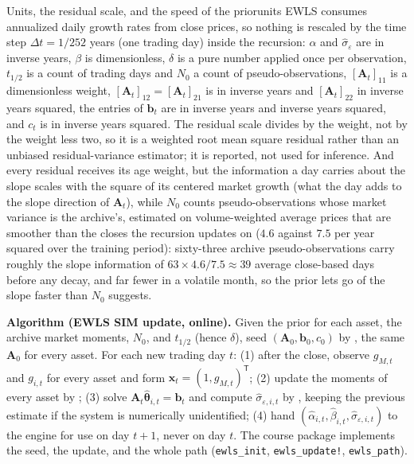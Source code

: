 \documentclass[11pt]{article}
\newcommand{\bx}{\mathbf x}
\newcommand{\bA}{\mathbf A}
\newcommand{\bb}{\mathbf b}
\newcommand{\bth}{\boldsymbol\theta}
\newcommand{\thalf}{t_{1/2}}
\begin{document}
\begin{remark}{Units, the residual scale, and the speed of the prior}{units}
EWLS consumes annualized daily growth rates from close prices, so nothing is rescaled by the time step $\Delta t=1/252$ years (one trading day) inside the recursion: $\alpha$ and $\hat\sigma_\varepsilon$ are in inverse years, $\beta$ is dimensionless, $\delta$ is a pure number applied once per observation, $\thalf$ is a count of trading days and $N_0$ a count of pseudo-observations, $[\bA_t]_{11}$ is a dimensionless weight, $[\bA_t]_{12}=[\bA_t]_{21}$ is in inverse years and $[\bA_t]_{22}$ in inverse years squared, the entries of $\bb_t$ are in inverse years and inverse years squared, and $c_t$ is in inverse years squared. The residual scale  divides by the weight, not by the weight less two, so it is a weighted root mean square residual rather than an unbiased residual-variance estimator; it is reported, not used for inference. And every residual receives its age weight, but the information a day carries about the slope scales with the square of its centered market growth (what the day adds to the slope direction of $\bA_t$), while $N_0$ counts pseudo-observations whose market variance is the archive's, estimated on volume-weighted average prices that are smoother than the closes the recursion updates on ($4.6$ against $7.5$ per year squared over the training period): sixty-three archive pseudo-observations carry roughly the slope information of $63\times4.6/7.5\approx39$ average close-based days before any decay, and far fewer in a volatile month, so the prior lets go of the slope faster than $N_0$ suggests.
\end{remark}

\medskip\noindent\textbf{Algorithm (EWLS SIM update, online).} Given the prior for each asset, the archive market moments, $N_0$, and $\thalf$ (hence $\delta$), seed $(\bA_0,\bb_0,c_0)$ by , the same $\bA_0$ for every asset. For each new trading day $t$: (1) after the close, observe $g_{M,t}$ and $g_{i,t}$ for every asset and form $\bx_t=(1,g_{M,t})^{\mathsf T}$; (2) update the moments of every asset by ; (3) solve $\bA_t\hat{\bth}_{i,t}=\bb_t$ and compute $\hat\sigma_{\varepsilon,i,t}$ by , keeping the previous estimate if the system is numerically unidentified; (4) hand $(\hat\alpha_{i,t},\hat\beta_{i,t},\hat\sigma_{\varepsilon,i,t})$ to the engine for use on day $t+1$, never on day $t$. The course package implements the seed, the update, and the whole path (\texttt{ewls\_init}, \texttt{ewls\_update!}, \texttt{ewls\_path}).
\end{document}
